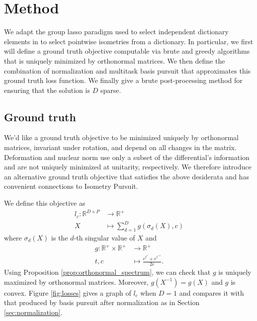 \section{Method}

We adapt the group lasso paradigm used to select independent dictionary elements in \citet{Koelle2022-ju, Koelle2024-no} to select pointwise isometries from a dictionary.
In particular, we first will define a ground truth objective computable via brute and greedy algorithms that is uniquely minimized by orthonormal matrices.
We then define the combination of normalization and multitask basis pursuit that approximates this ground truth loss function.
We finally give a brute post-processing method for ensuring that the solution is $D$ sparse.

\subsection{Ground truth}
\label{sec:ground_truth}

We'd like a ground truth objective to be minimized uniquely by orthonormal matrices, invariant under rotation, and depend on all changes in the matrix.
Deformation \citep{Kohli2021-lr} and nuclear norm \citep{Boyd2004-ql} use only a subset of the differential's information and are not uniquely minimized at unitarity, respectively.
We therefore introduce an alternative ground truth objective that satisfies the above desiderata and has convenient connections to Isometry Pursuit.

We define this objective as
\begin{align}
l_{c}: \mathbb R^{D \times P} &\to \mathbb R^{+} \\
X &\mapsto \sum_{d = 1}^D g(\sigma_d( X), c)
\end{align}
where $\sigma_d ( X)$ is the $d$-th singular value of $ X$ and
\begin{align}
g: \mathbb R^+ \times \mathbb R^+ &\to \mathbb R^+ \\
t,c &\mapsto \frac{e^{t^c} + e^{t^{-c}}}{2e}.
\end{align}
Using Proposition \ref{prop:orthonormal_spectrum}, we can check that $g$ is uniquely maximized by orthonormal matrices.
Moreover, $g( X^{-1}) = g( X)$ and $g$ is convex.
Figure \ref{fig:losses} gives a graph of $l_c$ when $D=1$ and compares it with that produced by basis pursuit after normalization as in Section \ref{sec:normalization}.

